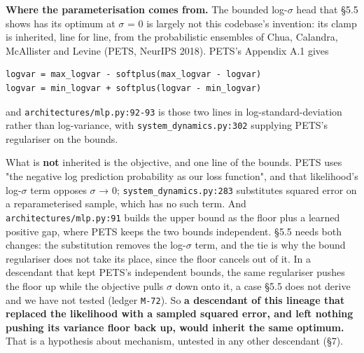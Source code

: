 \documentclass[10pt]{article}
\begin{document}
\textbf{Where the parameterisation comes from.} The bounded log-$\sigma$ head that \S{}5.5 shows has its optimum at $\sigma$ = 0 is largely not this codebase's invention: its clamp is inherited, line for line, from the probabilistic ensembles of Chua, Calandra, McAllister and Levine (PETS, NeurIPS 2018). PETS's Appendix A.1 gives

\begin{verbatim}
logvar = max_logvar - softplus(max_logvar - logvar)
logvar = min_logvar + softplus(logvar - min_logvar)
\end{verbatim}

and \texttt{architectures/\allowbreak{}mlp\allowbreak{}.py:92-93} is those two lines in log-standard-deviation rather than log-variance, with \texttt{system\_dynamics.py:302} supplying PETS's regulariser on the bounds.

What is \textbf{not} inherited is the objective, and one line of the bounds. PETS uses "the negative log prediction probability as our loss function", and that likelihood's log-$\sigma$ term opposes $\sigma$ → 0; \texttt{system\_dynamics.py:283} substitutes squared error on a reparameterised sample, which has no such term. And \texttt{architectures/\allowbreak{}mlp\allowbreak{}.py:91} builds the upper bound as the floor plus a learned positive gap, where PETS keeps the two bounds independent. \S{}5.5 needs both changes: the substitution removes the log-$\sigma$ term, and the tie is why the bound regulariser does not take its place, since the floor cancels out of it. In a descendant that kept PETS's independent bounds, the same regulariser pushes the floor up while the objective pulls $\sigma$ down onto it, a case \S{}5.5 does not derive and we have not tested (ledger \texttt{M-72}). So \textbf{a descendant of this lineage that replaced the likelihood with a sampled squared error, and left nothing pushing its variance floor back up, would inherit the same optimum.} That is a hypothesis about mechanism, untested in any other descendant (\S{}7).
\end{document}
